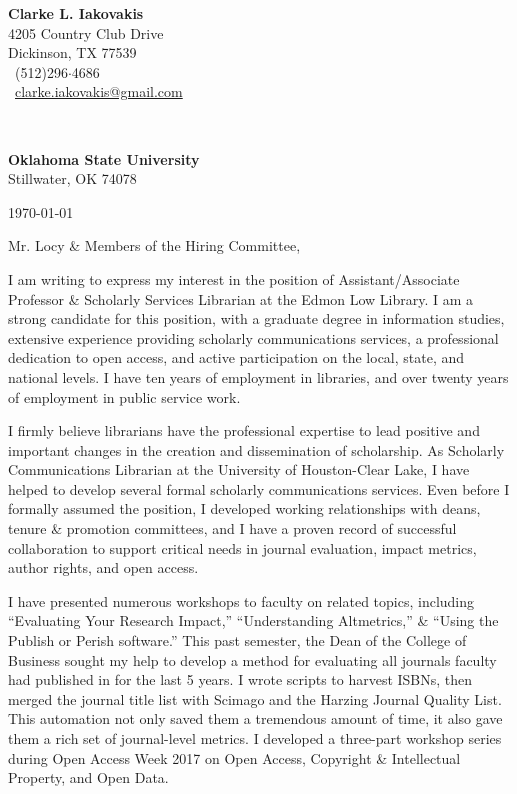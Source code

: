 \documentclass[12pt]{article}
\begin{document}
\rmfamily  %
\hfill%
\begin{minipage}[t]{.6\textwidth}
\raggedleft%
{\bfseries Clarke L. Iakovakis}\\
\small%
4205 Country Club Drive\\
Dickinson, TX  77539 \\
\Telefon~(512)296$\cdot$4686 \\
\Letter~\href{mailto:clarke.iakovakis@gmail.com}{clarke.iakovakis@gmail.com}
\end{minipage}\\

\begin{minipage}[t]{.4\textwidth}
\raggedright%
{\bfseries Oklahoma State University}\\
\small %
Stillwater, OK 74078
\end{minipage}

\hfill
\today

\raggedright

Mr. Locy \& Members of the Hiring Committee,

I am writing to express my interest in the position of Assistant/Associate Professor \& Scholarly Services Librarian at the Edmon Low Library. I am a strong candidate for this position, with a graduate degree in information studies, extensive experience providing scholarly communications services, a professional dedication to open access, and active participation on the local, state, and national levels. I have ten years of employment in libraries, and over twenty years of employment in public service work.

I firmly believe librarians have the professional expertise to lead positive and important changes in the creation and dissemination of scholarship. As Scholarly Communications Librarian at the University of Houston-Clear Lake, I have helped to develop several formal scholarly communications services. Even before I formally assumed the position, I developed working relationships with deans, tenure \& promotion committees, and I have a proven record of successful collaboration to support critical needs in journal evaluation, impact metrics, author rights, and open access. 

I have presented numerous workshops to faculty on related topics, including ``Evaluating Your Research Impact,'' ``Understanding Altmetrics,'' \& ``Using the Publish or Perish software.'' This past semester, the Dean of the College of Business sought my help to develop a method for evaluating all journals faculty had published in for the last 5 years. I wrote scripts to harvest ISBNs, then merged the journal title list with Scimago and the Harzing Journal Quality List. This automation not only saved them a tremendous amount of time, it also gave them a rich set of journal-level metrics. I developed a three-part workshop series during Open Access Week 2017 on Open Access, Copyright \& Intellectual Property, and Open Data.
\end{document}
